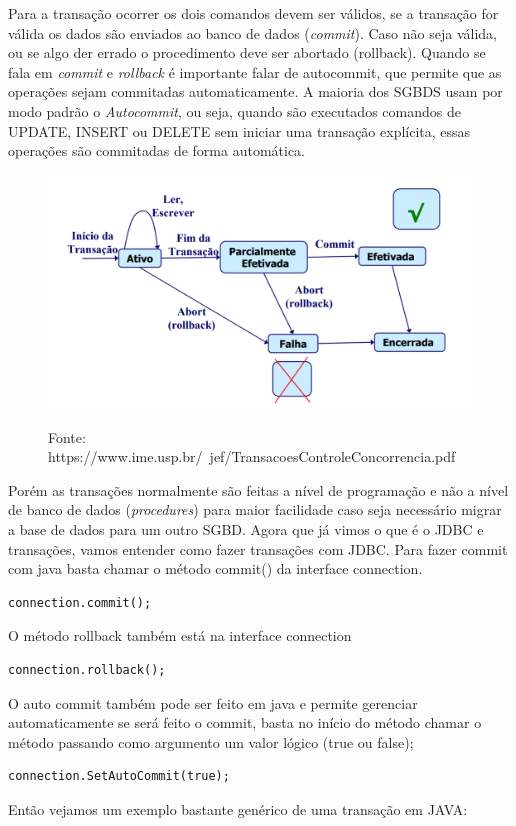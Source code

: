 \documentclass[12pt,a4paper]{article}
\begin{document}
 
Para a transação ocorrer os dois comandos devem ser válidos, se a transação for válida os dados são enviados ao banco de dados (\textit{commit}). Caso não seja válida, ou se algo der errado o procedimento deve ser abortado (rollback). 
Quando se fala em \textit{commit} e \textit{rollback} é importante falar de autocommit, que permite que as operações sejam commitadas automaticamente. A maioria dos SGBDS usam por modo padrão o \textit{Autocommit}, ou seja, quando são executados comandos de UPDATE, INSERT ou DELETE sem iniciar uma transação explícita, essas operações são commitadas de forma automática.
\newpage
        
\begin{figure}[h!]
\centering
\includegraphics[width=15cm]{recursos/imagens/commit_rollback.png}
\label{4}
\caption{Fonte: https://www.ime.usp.br/~jef/TransacoesControleConcorrencia.pdf}
\end{figure} 
Porém as transações normalmente são feitas a nível de programação e não a nível de banco de dados (\textit{procedures}) para maior facilidade caso seja necessário migrar a base de dados para um outro SGBD. 
Agora que já vimos o que é o JDBC e transações, vamos entender como fazer transações com JDBC.
Para fazer commit com java basta chamar o método commit() da interface connection.
\begin{lstlisting}
connection.commit();
\end{lstlisting}
O método rollback também está na interface connection
\begin{lstlisting}
connection.rollback();
\end{lstlisting}
O auto commit também pode ser feito em java e permite gerenciar automaticamente se será feito o commit, basta no início do método chamar o método passando como argumento um valor lógico (true ou false);
\begin{lstlisting}
connection.SetAutoCommit(true);
\end{lstlisting}
Então vejamos um exemplo bastante genérico de uma transação em JAVA:

 
\end{document}
